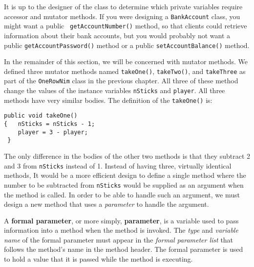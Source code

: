 \noindent It is up to the designer of the class to determine
which private
variables require accessor and mutator methods.  If you were designing
a {\tt BankAccount} class, you might want a public {\tt
getAccountNumber()} method, so that clients could retrieve information
about their bank accounts, but you would probably not want a public
{\tt getAccountPassword()} method or a public {\tt setAccountBalance()}
method.

In the remainder of this section, we will be concerned
with mutator methods. We defined three mutator methods named {\tt takeOne()},
{\tt takeTwo()}, and {\tt takeThree} as part of the {\tt OneRowNim} class
in the previous chapter.  All three of these method change the values of the
instance variables {\tt nSticks} and {\tt player}.  All three methods have
very similar bodies.  The definition of the {\tt takeOne()} is:

\begin{jjjlisting}
\begin{lstlisting}
public void takeOne()
{   nSticks = nSticks - 1;
    player = 3 - player;
 }
\end{lstlisting}
\end{jjjlisting}

\noindent The only difference in the bodies of the other two methods is 
that they subtract 2 and 3 from {\tt nSticks} instead of 1.  Instead
of having three, virtually identical methods, It would be a more
efficient design to define a single method where the number to be
subtracted from {\tt nSticks} would be supplied as an argument when
the method is called. In order to be able to handle such an argument,
we must design a new method that uses a {\em parameter} to handle
the argument. 

A {\bf formal parameter}, or more simply, {\bf parameter}, is a
variable used to pass
information into a method when the method is invoked.  The {\it type}
and {\it variable name} of the formal parameter must appear in the
{\it formal parameter list} that follows the method's name in the
method header.  The formal parameter is used to hold a value that it
is passed while the method is executing.


